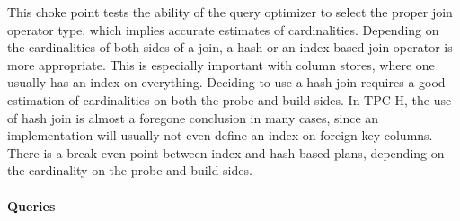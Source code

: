 
This choke point tests the ability of the query optimizer to select the proper join operator type, which implies accurate estimates of cardinalities.
Depending on the cardinalities of both sides of a join, a hash or an index-based join operator is more appropriate.
This is especially important with column stores, where one usually has an index on everything. Deciding to use a hash join requires a good estimation of cardinalities on both the probe and build sides.
In TPC-H, the use of hash join is almost a foregone conclusion in many cases, since an implementation will usually not even define an index on foreign key columns.
There is a break even point between index and hash based plans, depending on the cardinality on the probe and build sides.


\paragraph{Queries}
{\raggedright

}